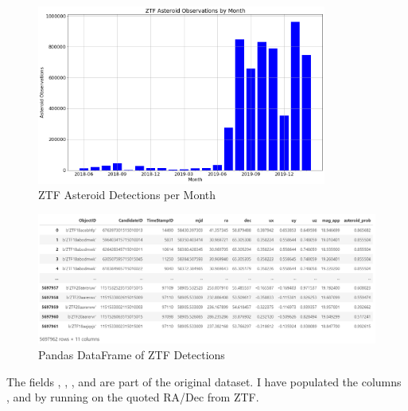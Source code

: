 \begin{figure}[hbt!]
\begin{center}
\includegraphics[width=0.85\textwidth]{../figs/ztf/ztf_ast_per_month.png}
\caption[ZTF Asteroid Detections per Month]
{ZTF Asteroid Detections per Month}
\end{center}
\end{figure}

\begin{figure}[hbt!]
\begin{center}
\includegraphics[width=1.0\textwidth]{../figs/ztf/ztf_dataframe.png}
\caption[Pandas DataFrame of ZTF Detections]
{Pandas DataFrame of ZTF Detections}
\end{center}
\end{figure}

The fields , , , and  are part of the original dataset.
I have populated the columns ,  and  by running  on the quoted RA/Dec from ZTF.

